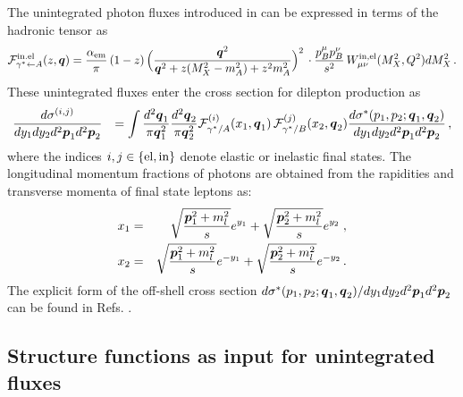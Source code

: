 The unintegrated photon fluxes introduced in \cite{daSilveira:2014jla}
can be expressed in terms of the hadronic tensor as 
\begin{eqnarray}
 {\cal{F}}^{{\rm{in.el}}}_{\gamma^* \leftarrow A} (z,\mbox{\boldmath $q$}) = {\alpha_{\rm{em}}\over \pi}  \, (1-z) \, 
\Big( {\mbox{\boldmath $q$}^2 \over \mbox{\boldmath $q$}^2 + z (M_X^2 - m_A^2) + z^2 m_A^2  }\Big)^2  \, 
\cdot {p_B^\mu p_B^\nu \over s^2} \, W^{\rm{in,el}}_{\mu \nu}(M_X^2,Q^2) dM_X^2 \, . \nonumber \\
\end{eqnarray}
These unintegrated fluxes enter the cross section for dilepton production as
\begin{eqnarray}
 {d \sigma^{(i,j)} \over dy_1 dy_2 d^2\mbox{\boldmath $p$}_1 d^2\mbox{\boldmath $p$}_2} &&=  \int  {d^2 \mbox{\boldmath $q$}_1 \over \pi \mbox{\boldmath $q$}_1^2} {d^2 \mbox{\boldmath $q$}_2 \over \pi \mbox{\boldmath $q$}_2^2}  
 {\cal{F}}^{(i)}_{\gamma^*/A}(x_1,\mbox{\boldmath $q$}_1) \, {\cal{F}}^{(j)}_{\gamma^*/B}(x_2,\mbox{\boldmath $q$}_2) 
{d \sigma^*(p_1,p_2;\mbox{\boldmath $q$}_1,\mbox{\boldmath $q$}_2) \over dy_1 dy_2 d^2\mbox{\boldmath $p$}_1 d^2\mbox{\boldmath $p$}_2} \, , \nonumber \\ 
\label{eq:kt-fact}
\end{eqnarray}
where the indices $i,j \in \{\rm{el}, \rm{in} \}$ denote elastic or inelastic final states.
The longitudinal momentum fractions of photons are obtained from the rapidities 
and transverse momenta of final state leptons as:
\begin{eqnarray}
x_1 &=& \sqrt{ {\mbox{\boldmath $p$}_1^2 + m_l^2 \over s}} e^{y_1} +  \sqrt{ {\mbox{\boldmath $p$}_2^2 +
    m_l^2 \over s}} e^{y_2} 
\; , \nonumber \\
x_2 &=& \sqrt{ {\mbox{\boldmath $p$}_1^2 + m_l^2 \over s}} e^{-y_1} +  \sqrt{ {\mbox{\boldmath $p$}_2^2 + m_l^2 \over s}} e^{-y_2} \, .
\end{eqnarray}
The explicit form of the off-shell cross section $d \sigma^*(p_1,p_2;\mbox{\boldmath $q$}_1,\mbox{\boldmath $q$}_2)/ dy_1 dy_2 d^2\mbox{\boldmath $p$}_1 d^2\mbox{\boldmath $p$}_2$ can be found in
Refs. \cite{daSilveira:2014jla,Luszczak:2015aoa}. 


\subsection{Structure functions as input for unintegrated fluxes}

